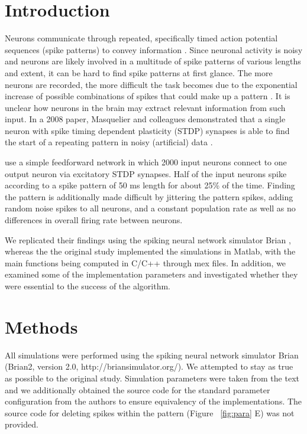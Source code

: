 \documentclass[10pt,a4paper,onecolumn]{article}
\begin{document}
\section{Introduction}\label{introduction}

Neurons communicate through repeated, specifically timed action
potential sequences (spike patterns) to convey information
\cite{Fellous2004, Prut1998}. Since neuronal activity is noisy and
neurons are likely involved in a multitude of spike patterns of various
lengths and extent, it can be hard to find spike patterns at first
glance. The more neurons are recorded, the more difficult the task
becomes due to the exponential increase of possible combinations of
spikes that could make up a pattern \cite{Buonomano2009}. It is unclear
how neurons in the brain may extract relevant information from such
input. In a 2008 paper, Masquelier and colleagues demonstrated that a
single neuron with spike timing dependent plasticity (STDP) synapses is
able to find the start of a repeating pattern in noisy (artificial) data
\cite{Masq2008}.

\textcite{Masq2008} use a simple feedforward network in which 2000 input
neurons connect to one output neuron via excitatory STDP synapses. Half
of the input neurons spike according to a spike pattern of 50 ms length
for about 25\% of the time. Finding the pattern is additionally made
difficult by jittering the pattern spikes, adding random noise spikes to
all neurons, and a constant population rate as well as no differences in
overall firing rate between neurons.

We replicated their findings using the spiking neural network simulator
Brian \cite{Goodman2009, Stimberg2014}, whereas the the original study
implemented the simulations in Matlab, with the main functions being
computed in C/C++ through mex files. In addition, we examined some of
the implementation parameters and investigated whether they were
essential to the success of the algorithm.

\section{Methods}\label{methods}

All simulations were performed using the spiking neural network
simulator Brian (Brian2, version 2.0, http://briansimulator.org/). We
attempted to stay as true as possible to the original study. Simulation
parameters were taken from the text and we additionally obtained the
source code for the standard parameter configuration from the authors to
ensure equivalency of the implementations. The source code for deleting
spikes within the pattern (Figure ~\ref{fig:para} E) was not provided.
\end{document}
